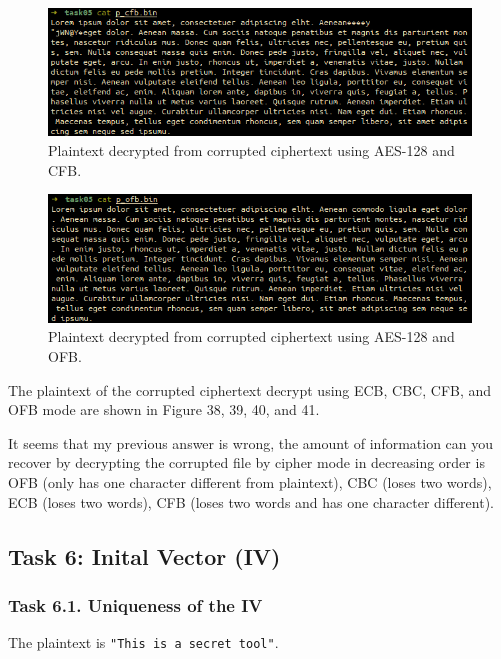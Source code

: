 \documentclass{article}
\begin{document}
\begin{figure}[!ht]
    \centering
    \includegraphics[scale=0.68]{task05_cfb.png}
    \caption{Plaintext decrypted from corrupted ciphertext using AES-128 and CFB.}
\end{figure}

\begin{figure}[!ht]
    \centering
    \includegraphics[scale=0.68]{task05_ofb.png}
    \caption{Plaintext decrypted from corrupted ciphertext using AES-128 and OFB.}
\end{figure}

The plaintext of the corrupted ciphertext decrypt using ECB, CBC, CFB, and OFB
mode are shown in Figure 38, 39, 40, and 41.

It seems that my previous answer is wrong, the amount of information can you recover
by decrypting the corrupted file by cipher mode in decreasing order is OFB (only
has one character different from plaintext), CBC (loses two words), ECB (loses
two words), CFB (loses two words and has one character different).

\newpage

\subsection{Task 6: Inital Vector (IV)}

\subsubsection{Task 6.1. Uniqueness of the IV}

The plaintext is \texttt{"This is a secret tool"}.
\end{document}
